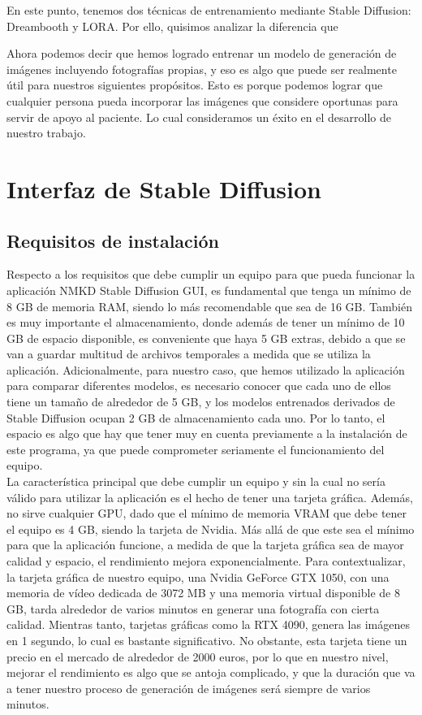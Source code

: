 En este punto, tenemos dos técnicas de entrenamiento mediante Stable Diffusion: Dreambooth y LORA. Por ello, quisimos analizar la diferencia que 

Ahora podemos decir que hemos logrado entrenar un modelo de generación de imágenes incluyendo fotografías propias, y eso es algo que puede ser realmente útil para nuestros siguientes propósitos. Esto es porque podemos lograr que cualquier persona pueda incorporar las imágenes que considere oportunas para servir de apoyo al paciente. Lo cual consideramos un éxito en el desarrollo de nuestro trabajo. 


\section{Interfaz de Stable Diffusion}

\subsection{Requisitos de instalación}

Respecto a los requisitos que debe cumplir un equipo para que pueda funcionar la aplicación NMKD Stable Diffusion GUI, es fundamental que tenga un mínimo de 8 GB de memoria RAM, siendo lo más recomendable que sea de 16 GB. También es muy importante el almacenamiento, donde además de tener un mínimo de 10 GB de espacio disponible, es conveniente que haya 5 GB extras, debido a que se van a guardar multitud de archivos temporales a medida que se utiliza la aplicación. Adicionalmente, para nuestro caso, que hemos utilizado la aplicación para comparar diferentes modelos, es necesario conocer que cada uno de ellos tiene un tamaño de alrededor de 5 GB, y los modelos entrenados derivados de Stable Diffusion ocupan 2 GB de almacenamiento cada uno. Por lo tanto, el espacio es algo que hay que tener muy en cuenta previamente a la instalación de este programa, ya que puede comprometer seriamente el funcionamiento del equipo. \\

La característica principal que debe cumplir un equipo y sin la cual no sería válido para utilizar la aplicación es el hecho de tener una tarjeta gráfica. Además, no sirve cualquier GPU, dado que el mínimo de memoria VRAM que debe tener el equipo es 4 GB, siendo la tarjeta de Nvidia. Más allá de que este sea el mínimo para que la aplicación funcione, a medida de que la tarjeta gráfica sea de mayor calidad y espacio, el rendimiento mejora exponencialmente. Para contextualizar, la tarjeta gráfica de nuestro equipo, una Nvidia GeForce GTX 1050, con una memoria de vídeo dedicada de 3072 MB y una memoria virtual disponible de 8 GB, tarda alrededor de varios minutos en generar una fotografía con cierta calidad. Mientras tanto, tarjetas gráficas como la RTX 4090, genera las imágenes en 1 segundo, lo cual es bastante significativo. No obstante, esta tarjeta tiene un precio en el mercado de alrededor de 2000 euros, por lo que en nuestro nivel, mejorar el rendimiento es algo que se antoja complicado, y que la duración que va a tener nuestro proceso de generación de imágenes será siempre de varios minutos.\\


